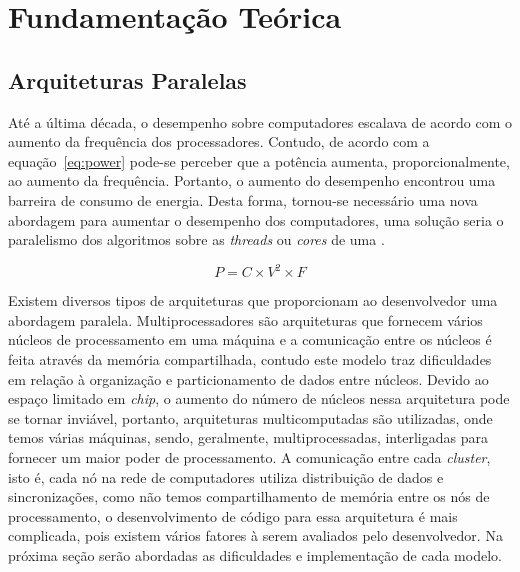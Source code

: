 \chapter{Fundamentação Teórica}


\section{Arquiteturas Paralelas}
Até a última década, o desempenho sobre computadores escalava de acordo com o aumento da frequência dos processadores. Contudo, de acordo com a equação~\eqref{eq:power} pode-se perceber que a potência aumenta, proporcionalmente, ao aumento da frequência. Portanto, o aumento do desempenho encontrou uma barreira de consumo de energia. Desta forma, tornou-se necessário uma nova abordagem para aumentar o desempenho dos computadores, uma solução seria o paralelismo dos algoritmos sobre as \textit{threads} ou \textit{cores} de uma \cpu.

\begin{equation}\label{eq:power}
	P = C \times V^2 \times F
\end{equation}

Existem diversos tipos de arquiteturas que proporcionam ao desenvolvedor uma abordagem paralela. Multiprocessadores são arquiteturas que fornecem vários núcleos de processamento em uma máquina e a comunicação entre os núcleos é feita através da memória compartilhada, contudo este modelo traz dificuldades em relação à organização e particionamento de dados entre núcleos. Devido ao espaço limitado em \textit{chip}, o aumento do número de núcleos nessa arquitetura pode se tornar inviável, portanto, arquiteturas multicomputadas são utilizadas, onde temos várias máquinas, sendo, geralmente, multiprocessadas, interligadas para fornecer um maior poder de processamento. A comunicação entre cada \textit{cluster}, isto é, cada nó na rede de computadores utiliza distribuição de dados e sincronizações, como não temos compartilhamento de memória entre os nós de processamento, o desenvolvimento de código para essa arquitetura é mais complicada, pois existem vários fatores à serem avaliados pelo desenvolvedor. Na próxima seção serão abordadas as dificuldades e implementação de cada modelo.



